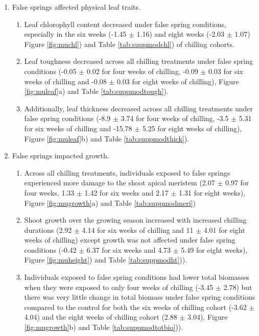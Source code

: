 \documentclass{article}\usepackage[]{graphicx}\usepackage[]{color}
\begin{document}
\begin{enumerate}
\item False springs affected physical leaf traits.
  \begin{enumerate}
  \item Leaf chlorophyll content decreased under false spring conditions, especially in the six weeks (-1.45 $\pm$ 1.16) and eight weeks (-2.03 $\pm$ 1.07) Figure \ref{fig:muchl}) and Table \ref{tab:suppmodchl}) of chilling cohorts.
  \item Leaf toughness decreased across all chilling treatments under false spring conditions (-0.05 $\pm$ 0.02 for four weeks of chilling, -0.09 $\pm$ 0.03 for six weeks of chilling and -0.08 $\pm$ 0.03 for eight weeks of chilling), Figure \ref{fig:muleaf}a) and Table \ref{tab:suppmodtough}).
  \item Additionally, leaf thickness decreased across all chilling treatments under false spring conditions (-8.9 $\pm$ 3.74 for four weeks of chilling, -3.5 $\pm$ 5.31 for six weeks of chilling and -15.78 $\pm$ 5.25 for eight weeks of chilling), Figure \ref{fig:muleaf}b) and Table \ref{tab:suppmodthick}).
  \end{enumerate}
  
\item False springs impacted growth.
  \begin{enumerate}
  \item Across all chilling treatments, individuals exposed to false springs experienced more damage to the shoot apical meristem (2.07 $\pm$ 0.97 for four weeks, 1.33 $\pm$ 1.42 for six weeks and 2.17 $\pm$ 1.31 for eight weeks), Figure \ref{fig:mugrowth}a) and Table \ref{tab:suppmodmeri}) 
  \item Shoot growth over the growing season increased with increased chilling durations (2.92 $\pm$ 4.14 for six weeks of chilling and 11 $\pm$ 4.01 for eight weeks of chilling) except growth was not affected under false spring conditions (-0.42 $\pm$ 6.37 for six weeks and 4.73 $\pm$ 5.49 for eight weeks), Figure \ref{fig:muheight}) and Table \ref{tab:suppmodht})).
  \item Individuals exposed to false spring conditions had lower total biomasses when they were exposed to only four weeks of chilling (-3.45 $\pm$ 2.78) but there was very little change in total biomass under false spring conditions compared to the control for both the six weeks of chilling cohort (-3.62 $\pm$ 4.04) and the eight weeks of chilling cohort (2.88 $\pm$ 3.04), Figure \ref{fig:mugrowth}b) and Table \ref{tab:suppmodtotbio})).
  \end{enumerate}
\end{enumerate}
\end{document}
